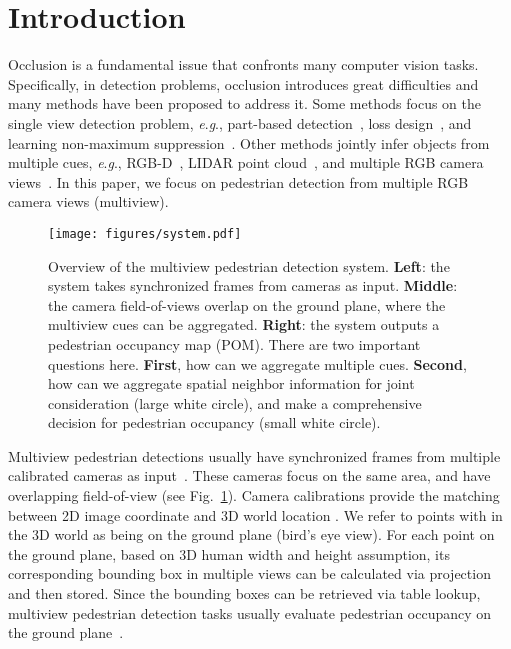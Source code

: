 \documentclass[runningheads]{llncs}
\newcommand{\eg}{\textit{e}.\textit{g}.}
\begin{document}
\section{Introduction}
\label{sec:intro}

Occlusion is a fundamental issue that confronts many computer vision tasks. Specifically, in detection problems, occlusion introduces great difficulties and many methods have been proposed to address it. Some methods focus on the single view detection problem, \eg, part-based detection~\cite{tian2015deep,ouyang2015partial,zhou2017multi}, loss design~\cite{zhang2018occlusion,wang2018repulsion}, and learning non-maximum suppression~\cite{hosang2017learning}. Other methods jointly infer objects from multiple cues, \eg, RGB-D~\cite{gupta2014learning,hoffman2016cross,qi2018frustum}, LIDAR point cloud~\cite{chen2017multi}, and multiple RGB camera views~\cite{fleuret2007multicamera,chavdarova2018wildtrack}. In this paper, we focus on pedestrian detection from multiple RGB camera views (multiview).



\begin{figure}[t]
    \centering
    \texttt{[image: figures/system.pdf]}
    \caption{Overview of the multiview pedestrian detection system. \textbf{Left}: the system takes synchronized frames from  cameras as input. \textbf{Middle}: the camera field-of-views overlap on the ground plane, where the multiview cues can be aggregated. \textbf{Right}: the system outputs a pedestrian occupancy map (POM). There are two important questions here. \textbf{First}, how can we aggregate multiple cues. \textbf{Second}, how can we aggregate spatial neighbor information for joint consideration (large white circle), and make a comprehensive decision for pedestrian occupancy (small white circle). 
    }
    \label{fig:system}
\end{figure}


Multiview pedestrian detections usually have synchronized frames from multiple calibrated cameras as input~\cite{fleuret2007multicamera,roig2011conditional,chavdarova2018wildtrack}. These cameras focus on the same area, and have overlapping field-of-view (see Fig.~\ref{fig:system}). 
Camera calibrations provide the matching between 2D image coordinate  and 3D world location . We refer to points with  in the 3D world as being on the ground plane (bird's eye view). For each point on the ground plane, based on 3D human width and height assumption, its corresponding bounding box in multiple views can be calculated via projection and then stored. Since the bounding boxes can be retrieved via table lookup, multiview pedestrian detection tasks usually evaluate pedestrian occupancy on the ground plane~\cite{fleuret2007multicamera,chavdarova2018wildtrack}. 
\end{document}
